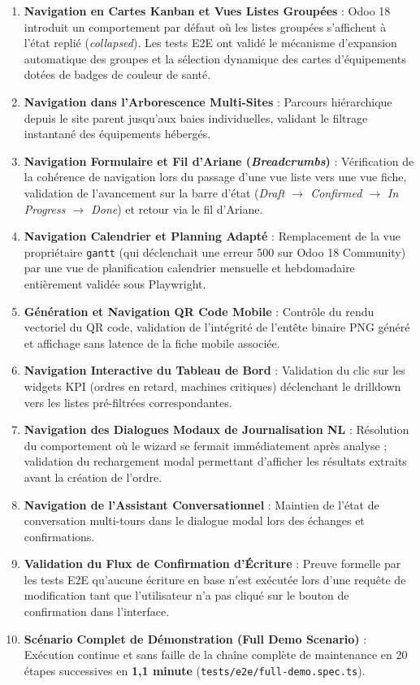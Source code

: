 \begin{enumerate}[leftmargin=1.2cm, label=\textbf{\arabic*.}]
    \item \textbf{Navigation en Cartes Kanban et Vues Listes Groupées} : Odoo 18 introduit un comportement par défaut où les listes groupées s'affichent à l'état replié (\textit{collapsed}). Les tests E2E ont validé le mécanisme d'expansion automatique des groupes et la sélection dynamique des cartes d'équipements dotées de badges de couleur de santé.
    \item \textbf{Navigation dans l'Arborescence Multi-Sites} : Parcours hiérarchique depuis le site parent jusqu'aux baies individuelles, validant le filtrage instantané des équipements hébergés.
    \item \textbf{Navigation Formulaire et Fil d'Ariane (\textit{Breadcrumbs})} : Vérification de la cohérence de navigation lors du passage d'une vue liste vers une vue fiche, validation de l'avancement sur la barre d'état (\textit{Draft $\rightarrow$ Confirmed $\rightarrow$ In Progress $\rightarrow$ Done}) et retour via le fil d'Ariane.
    \item \textbf{Navigation Calendrier et Planning Adapté} : Remplacement de la vue propriétaire \texttt{gantt} (qui déclenchait une erreur 500 sur Odoo 18 Community) par une vue de planification calendrier mensuelle et hebdomadaire entièrement validée sous Playwright.
    \item \textbf{Génération et Navigation QR Code Mobile} : Contrôle du rendu vectoriel du QR code, validation de l'intégrité de l'entête binaire PNG généré et affichage sans latence de la fiche mobile associée.
    \item \textbf{Navigation Interactive du Tableau de Bord} : Validation du clic sur les widgets KPI (ordres en retard, machines critiques) déclenchant le drilldown vers les listes pré-filtrées correspondantes.
    \item \textbf{Navigation des Dialogues Modaux de Journalisation NL} : Résolution du comportement où le wizard se fermait immédiatement après analyse ; validation du rechargement modal permettant d'afficher les résultats extraits avant la création de l'ordre.
    \item \textbf{Navigation de l'Assistant Conversationnel} : Maintien de l'état de conversation multi-tours dans le dialogue modal lors des échanges et confirmations.
    \item \textbf{Validation du Flux de Confirmation d'Écriture} : Preuve formelle par les tests E2E qu'aucune écriture en base n'est exécutée lors d'une requête de modification tant que l'utilisateur n'a pas cliqué sur le bouton de confirmation dans l'interface.
    \item \textbf{Scénario Complet de Démonstration (Full Demo Scenario)} : Exécution continue et sans faille de la chaîne complète de maintenance en 20 étapes successives en \textbf{1,1 minute} (\texttt{tests/e2e/full-demo.spec.ts}).
\end{enumerate}

